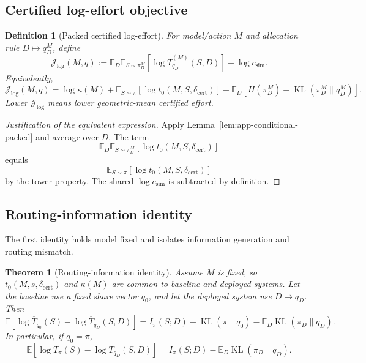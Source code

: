 \documentclass{article}
\newtheorem{definition}{Definition}
\newtheorem{theorem}{Theorem}
\DeclareMathOperator{\KL}{KL}
\newcommand{\E}{\mathbb{E}}
\newcommand{\J}{\mathcal{J}}
\begin{document}
\subsection{Certified log-effort objective}

\begin{definition}[Packed certified log-effort]
\label{def:app-certified-log-effort}
For model/action \(M\) and allocation rule \(D\mapsto q_D^M\), define
\[
    \J_{\log}(M,q)
    :=
    \E_D
    \E_{S\sim\pi_D^M}
    \left[
        \log \overline T^{(M)}_{q_D}(S,D)
    \right]
    -
    \log c_{\mathrm{sim}}.
\]
Equivalently,
\[
\boxed{
    \J_{\log}(M,q)
    =
    \log\kappa(M)
    +
    \E_{S\sim\pi}
    [\log t_0(M,S,\delta_{\mathrm{cert}})]
    +
    \E_D
    \left[
        H(\pi_D^M)+\KL(\pi_D^M\|q_D^M)
    \right].
}
\]
Lower \(\J_{\log}\) means lower geometric-mean certified effort.
\end{definition}

\begin{proof}[Justification of the equivalent expression]
Apply Lemma~\ref{lem:app-conditional-packed} and average over \(D\).
The term
\[
    \E_D\E_{S\sim\pi_D^M}[\log t_0(M,S,\delta_{\mathrm{cert}})]
\]
equals
\[
    \E_{S\sim\pi}[\log t_0(M,S,\delta_{\mathrm{cert}})]
\]
by the tower property.
The shared \(\log c_{\mathrm{sim}}\) is subtracted by definition.
\end{proof}

\subsection{Routing-information identity}

The first identity holds model fixed and isolates information generation and routing mismatch.

\begin{theorem}[Routing-information identity]
\label{thm:app-routing-information}
Assume \(M\) is fixed, so \(t_0(M,s,\delta_{\mathrm{cert}})\) and \(\kappa(M)\) are common
to baseline and deployed systems.
Let the baseline use a fixed share vector \(q_0\), and let the deployed system use
\(D\mapsto q_D\).
Then
\[
\boxed{
    \E
    \left[
        \log \overline T_{q_0}(S)
        -
        \log \overline T_{q_D}(S,D)
    \right]
    =
    I_\pi(S;D)+\KL(\pi\|q_0)-\E_D\KL(\pi_D\|q_D).
}
\]
In particular, if \(q_0=\pi\),
\[
    \E
    \left[
        \log \overline T_{\pi}(S)
        -
        \log \overline T_{q_D}(S,D)
    \right]
    =
    I_\pi(S;D)-\E_D\KL(\pi_D\|q_D).
\]
\end{theorem}
\end{document}
